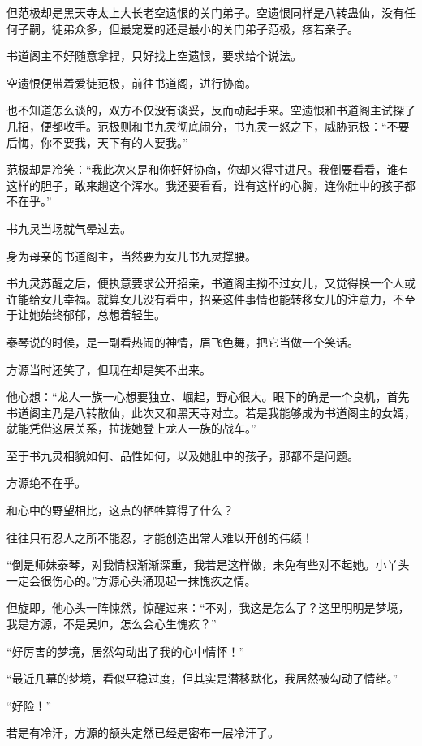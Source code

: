 \begin{this_body}
但范极却是黑天寺太上大长老空遗恨的关门弟子。空遗恨同样是八转蛊仙，没有任何子嗣，徒弟众多，但最宠爱的还是最小的关门弟子范极，疼若亲子。

书道阁主不好随意拿捏，只好找上空遗恨，要求给个说法。

空遗恨便带着爱徒范极，前往书道阁，进行协商。

也不知道怎么谈的，双方不仅没有谈妥，反而动起手来。空遗恨和书道阁主试探了几招，便都收手。范极则和书九灵彻底闹分，书九灵一怒之下，威胁范极：“不要后悔，你不要我，天下有的人要我。”

范极却是冷笑：“我此次来是和你好好协商，你却来得寸进尺。我倒要看看，谁有这样的胆子，敢来趟这个浑水。我还要看看，谁有这样的心胸，连你肚中的孩子都不在乎。”

书九灵当场就气晕过去。

身为母亲的书道阁主，当然要为女儿书九灵撑腰。

书九灵苏醒之后，便执意要求公开招亲，书道阁主拗不过女儿，又觉得换一个人或许能给女儿幸福。就算女儿没有看中，招亲这件事情也能转移女儿的注意力，不至于让她始终郁郁，总想着轻生。

泰琴说的时候，是一副看热闹的神情，眉飞色舞，把它当做一个笑话。

方源当时还笑了，但现在却是笑不出来。

他心想：“龙人一族一心想要独立、崛起，野心很大。眼下的确是一个良机，首先书道阁主乃是八转散仙，此次又和黑天寺对立。若是我能够成为书道阁主的女婿，就能凭借这层关系，拉拢她登上龙人一族的战车。”

至于书九灵相貌如何、品性如何，以及她肚中的孩子，那都不是问题。

方源绝不在乎。

和心中的野望相比，这点的牺牲算得了什么？

往往只有忍人之所不能忍，才能创造出常人难以开创的伟绩！

“倒是师妹泰琴，对我情根渐渐深重，我若是这样做，未免有些对不起她。小丫头一定会很伤心的。”方源心头涌现起一抹愧疚之情。

但旋即，他心头一阵悚然，惊醒过来：“不对，我这是怎么了？这里明明是梦境，我是方源，不是吴帅，怎么会心生愧疚？”

“好厉害的梦境，居然勾动出了我的心中情怀！”

“最近几幕的梦境，看似平稳过度，但其实是潜移默化，我居然被勾动了情绪。”

“好险！”

若是有冷汗，方源的额头定然已经是密布一层冷汗了。


\end{this_body}
